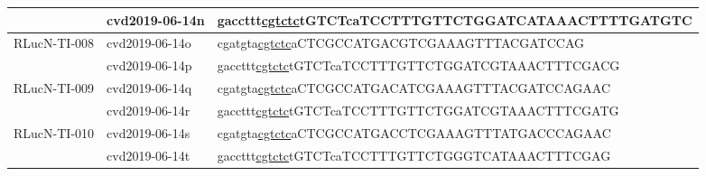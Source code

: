 \begin{table}[]
{\begin{tabular}{|l|l|l|}
			& cvd2019-06-14n & gaccttt\underline{cgtctc}tGTCTcaTCCTTTGTTCTGGATCATAAACTTTTGATGTC \\ \hline
			\multirow{2}{*}{RLucN-TI-008} & cvd2019-06-14o & cgatgta\underline{cgtctc}aCTCGCCATGACGTCGAAAGTTTACGATCCAG        \\ \cline{2-3} 
			& cvd2019-06-14p & gaccttt\underline{cgtctc}tGTCTcaTCCTTTGTTCTGGATCGTAAACTTTCGACG   \\ \hline
			\multirow{2}{*}{RLucN-TI-009} & cvd2019-06-14q & cgatgta\underline{cgtctc}aCTCGCCATGACATCGAAAGTTTACGATCCAGAAC     \\ \cline{2-3} 
			& cvd2019-06-14r & gaccttt\underline{cgtctc}tGTCTcaTCCTTTGTTCTGGATCGTAAACTTTCGATG   \\ \hline
			\multirow{2}{*}{RLucN-TI-010} & cvd2019-06-14s & cgatgta\underline{cgtctc}aCTCGCCATGACCTCGAAAGTTTATGACCCAGAAC     \\ \cline{2-3} 
			& cvd2019-06-14t & gaccttt\underline{cgtctc}tGTCTcaTCCTTTGTTCTGGGTCATAAACTTTCGAG    \\ \hline
		\end{tabular}%
	}
\end{table}